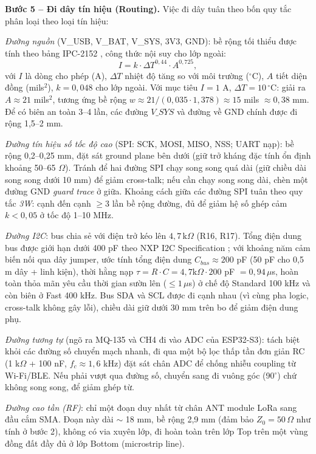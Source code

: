 \textbf{Bước 5 -- Đi dây tín hiệu (Routing).} Việc đi dây tuân theo bốn quy tắc phân loại theo loại tín hiệu:

\emph{Đường nguồn} (V\_USB, V\_BAT, V\_SYS, 3V3, GND): bề rộng tối thiểu được tính theo bảng IPC-2152 \cite{ipc2152}, công thức nội suy cho lớp ngoài:
\begin{equation}
\label{eq:trace_width}
    I = k\cdot \Delta T^{0{,}44}\cdot A^{0{,}725},
\end{equation}
với $I$ là dòng cho phép (A), $\Delta T$ nhiệt độ tăng so với môi trường ($^\circ$C), $A$ tiết diện đồng (mils$^2$), $k=0{,}048$ cho lớp ngoài. Với mục tiêu $I=1$ A, $\Delta T = 10\,^\circ$C: giải ra $A \approx 21$ mils$^2$, tương ứng bề rộng $w \approx 21/(0{,}035\cdot 1{,}378) \approx 15$ mils $\approx 0{,}38$ mm. Để có biên an toàn 3--4 lần, các đường $V\_SYS$ và đường về GND chính được đi rộng 1{,}5--2 mm.

\emph{Đường tín hiệu số tốc độ cao} (SPI: SCK, MOSI, MISO, NSS; UART nạp): bề rộng 0{,}2--0{,}25 mm, đặt sát ground plane bên dưới (giữ trở kháng đặc tính ổn định khoảng 50--65 $\Omega$). Tránh để hai đường SPI chạy song song quá dài (giữ chiều dài song song dưới 10 mm) để giảm cross-talk; nếu cần chạy song song dài, chèn một đường GND \emph{guard trace} ở giữa. Khoảng cách giữa các đường SPI tuân theo quy tắc \emph{3W}: cạnh đến cạnh $\ge 3$ lần bề rộng đường, đủ để giảm hệ số ghép cảm $k<0{,}05$ ở tốc độ 1--10 MHz.

\emph{Đường I2C}: bus chia sẻ với điện trở kéo lên $4{,}7\,\text{k}\Omega$ (R16, R17). Tổng điện dung bus được giới hạn dưới 400 pF theo NXP I2C Specification \cite{nxp2014i2c}; với khoảng năm cảm biến nối qua dây jumper, ước tính tổng điện dung $C_{bus}\approx 200$ pF (50 pF cho 0{,}5 m dây + linh kiện), thời hằng nạp $\tau=R\cdot C=4{,}7\text{k}\Omega \cdot 200$ pF $=0{,}94\,\mu$s, hoàn toàn thỏa mãn yêu cầu thời gian sườn lên ($\le 1\,\mu$s) ở chế độ Standard 100 kHz và còn biên ở Fast 400 kHz. Bus SDA và SCL được đi cạnh nhau (vì cùng pha logic, cross-talk không gây lỗi), chiều dài giữ dưới 30 mm trên bo để giảm điện dung phụ.

\emph{Đường tương tự} (ngõ ra MQ-135 và CH4 đi vào ADC của ESP32-S3): tách biệt khỏi các đường số chuyển mạch nhanh, đi qua một bộ lọc thấp tần đơn giản RC (1 k$\Omega$ + 100 nF, $f_c \approx 1{,}6$ kHz) đặt sát chân ADC để chống nhiễu coupling từ Wi-Fi/BLE. Nếu phải vượt qua đường số, chuyển sang đi vuông góc (90$^\circ$) chứ không song song, để giảm ghép từ.

\emph{Đường cao tần (RF)}: chỉ một đoạn duy nhất từ chân ANT module LoRa sang đầu cắm SMA. Đoạn này dài $\sim$ 18 mm, bề rộng 2{,}9 mm (đảm bảo $Z_0=50\,\Omega$ như tính ở bước 2), không có via xuyên lớp, đi hoàn toàn trên lớp Top trên một vùng đồng đất đầy đủ ở lớp Bottom (microstrip line).

